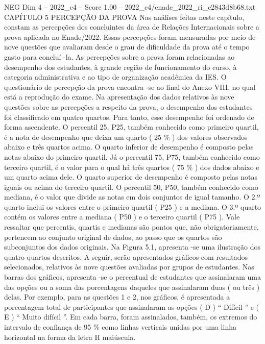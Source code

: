 \begin{textsample}{NEG Dim 4 – 2022\_c4 – Score 1.00 – 2022\_c4/enade\_2022\_ri\_c2843d8b68.txt}  \label{ex:f4_neg_218}
CAPÍTULO 5 PERCEPÇÃO DA PROVA Nas análises feitas neste capítulo, constam as percepções dos concluintes da área de Relações Internacionais sobre a prova aplicada no Enade/2022.
Essas percepções foram mensuradas por meio de nove questões que avaliaram desde o grau de dificuldade da prova até o tempo gasto para concluí -la.
As percepções sobre a prova foram relacionadas ao desempenho dos estudantes, à grande região de funcionamento do curso, à categoria administrativa e ao tipo de organização acadêmica da IES.
O questionário de percepção da prova encontra -se ao final do Anexo VIII, no qual está a reprodução do exame.
Na apresentação dos dados relativos às nove questões sobre as percepções a respeito da prova, o desempenho dos estudantes foi classificado em quatro quartos.
Para tanto, esse desempenho foi ordenado de forma ascendente.
O percentil 25, P25, também conhecido como primeiro quartil, é a nota de desempenho que deixa um quarto ( 25 \% ) dos valores observados abaixo e três quartos acima.
O quarto inferior de desempenho é composto pelas notas abaixo do primeiro quartil.
Já o percentil 75, P75, também conhecido como terceiro quartil, é o valor para o qual há três quartos ( 75 \% ) dos dados abaixo e um quarto acima dele.
O quarto superior de desempenho é composto pelas notas iguais ou acima do terceiro quartil.
O percentil 50, P50, também conhecido como mediana, é o valor que divide as notas em dois conjuntos de igual tamanho.
O 2.º quarto inclui os valores entre o primeiro quartil ( P25 ) e a mediana.
O 3.º quarto contém os valores entre a mediana ( P50 ) e o terceiro quartil ( P75 ).
Vale ressaltar que percentis, quartis e medianas são pontos que, não obrigatoriamente, pertencem ao conjunto original de dados, ao passo que os quartos são subconjuntos dos dados originais.
Na Figura 5.1, apresenta -se uma ilustração dos quatro quartos descritos.
A seguir, serão apresentados gráficos com resultados selecionados, relativos às nove questões avaliadas por grupos de estudantes.
Nas barras dos gráficos, apresenta -se o percentual de estudantes que assinalaram uma das opções ou a soma das porcentagens daqueles que assinalaram duas ( ou três ) delas.
Por exemplo, para as questões 1 e 2, nos gráficos, é apresentada a porcentagem total de participantes que assinalaram as opções ( D ) “ Difícil ” e ( E ) “ Muito difícil ”.
Em cada barra, foram assinalados, também, os extremos do intervalo de confiança de 95 \% como linhas verticais unidas por uma linha horizontal na forma da letra H maiúscula.

\end{textsample}
